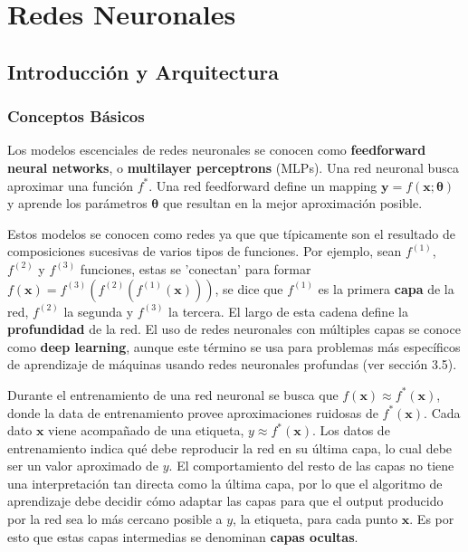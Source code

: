 
\newpage
\section{Redes Neuronales}

\subsection{Introducci\'on y Arquitectura}

\subsubsection{Conceptos B\'asicos}

Los modelos escenciales de redes neuronales se conocen como \textbf{feedforward neural networks}, o \textbf{multilayer perceptrons} (MLPs). Una red neuronal busca aproximar una funci\'on $f^*$. Una red feedforward define un mapping $\bm{y}=f(\bm{x}; \bm{\theta})$ y aprende los par\'ametros $\bm{\theta}$ que resultan en la mejor aproximaci\'on posible.

Estos modelos se conocen como redes ya que que t\'ipicamente son el resultado de composiciones sucesivas de varios tipos de funciones. Por ejemplo, sean $f^{(1)}$, $f^{(2)}$ y $f^{(3)}$ funciones, estas se 'conectan' para formar $f(\bm{x}) = f^{(3)}(f^{(2)}(f^{(1)}(\bm{x})))$, se dice que $f^{(1)}$ es la primera \textbf{capa} de la red, $f^{(2)}$ la segunda y $f^{(3)}$ la tercera. El largo de esta cadena define la \textbf{profundidad} de la red. El uso de redes neuronales con m\'ultiples capas se conoce como \textbf{deep learning}, aunque este t\'ermino se usa para problemas m\'as espec\'ificos de aprendizaje de m\'aquinas usando redes neuronales profundas (ver secci\'on 3.5).

Durante el entrenamiento de una red neuronal se busca que $f(\bm{x}) \approx f^*(\bm{x})$, donde la data de entrenamiento provee aproximaciones ruidosas de $f^*(\bm{x})$. Cada dato $\bm{x}$ viene acompa{\~{n}}ado de una etiqueta, $y \approx f^*(\bm{x})$. Los datos de entrenamiento indica qu\'e debe reproducir la red en su \'ultima capa, lo cual debe ser un valor aproximado de $y$. El comportamiento del resto de las capas no tiene una interpretación tan directa como la última capa, por lo que el algoritmo de aprendizaje debe decidir c\'omo adaptar las capas para que el output producido por la red sea lo m\'as cercano posible a $y$, la etiqueta, para cada punto $\bm{x}$. Es por esto que estas capas intermedias se denominan \textbf{capas ocultas}.

